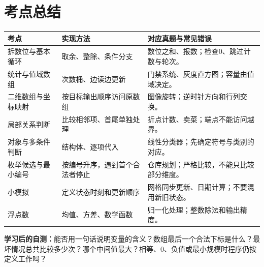 \section{考点总结}
\begin{longtable}{P{3cm}P{5cm}P{6.1cm}}
\toprule 考点 & 实现方法 & 对应真题与常见错误\\\midrule\endhead
拆数位与基本循环 & 取余、整除、条件分支 & 数位之和、报数；检查0、跳过计数与轮次。\\
统计与值域数组 & 次数桶、边读边更新 & 门禁系统、灰度直方图；容量由值域决定。\\
二维数组与坐标映射 & 按目标输出顺序访问原数组 & 图像旋转；逆时针方向和行列交换。\\
局部关系判断 & 比较相邻项、首尾单独处理 & 折点计数、卖菜；端点不能访问越界。\\
对象与多条件判断 & 结构体、逐项代入 & 线性分类器；先确定符号与类别的对应。\\
枚举候选与最小编号 & 按编号升序，遇到首个合法者停止 & 仓库规划；严格比较，不能只比较部分维度。\\
小模拟 & 定义状态时刻和更新顺序 & 网格同步更新、日期计算；不要混用新旧状态。\\
浮点数 & 均值、方差、数学函数 & 归一化处理；整数除法和输出精度。\\
\bottomrule\end{longtable}
\textbf{学习后的自测：}能否用一句话说明变量的含义？数组最后一个合法下标是什么？最坏情况总共比较多少次？哪个中间值最大？相等、0、负值或最小规模时程序仍按定义工作吗？
